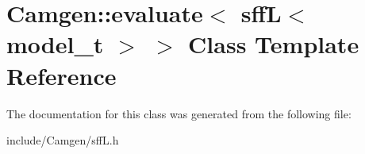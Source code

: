 \hypertarget{a00192}{}\section{Camgen\+:\+:evaluate$<$ sff\+L$<$ model\+\_\+t $>$ $>$ Class Template Reference}
\label{a00192}


The documentation for this class was generated from the following file\+:\begin{DoxyCompactItemize}
\item 
include/\+Camgen/sff\+L.\+h\end{DoxyCompactItemize}

